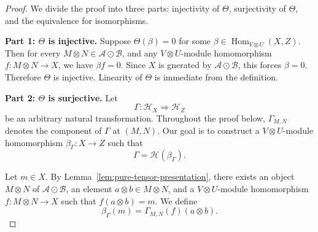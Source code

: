 \documentclass[12pt, english]{article}
\numberwithin{equation}{section}
\DeclareMathOperator{\Hom}{Hom}
\theoremstyle{plain}
\theoremstyle{definition}
\theoremstyle{remark}
\begin{document}
	\begin{proof}
		
		We divide the proof into three parts: injectivity of $\Theta$, surjectivity of $\Theta$, and the equivalence for isomorphisms.
		
		\smallskip
		\noindent\textbf{Part 1: $\Theta$ is injective.}
		Suppose $\Theta(\beta) = 0$ for some $\beta \in \Hom_{V \otimes U} (X, Z)$.
		Then for every $M \otimes N \in \mathcal{A} \odot \mathcal{B}$, and any $V \otimes U$-module homomorphism $f \colon M \otimes N \to X$, we have $\beta f = 0$.
		Since $X$ is gnerated by $\mathcal{A} \odot \mathcal{B}$, this forces $\beta = 0$.
		Therefore $\Theta$ is injective.  Linearity of $\Theta$ is immediate from the definition.
		
		\smallskip
		\noindent\textbf{Part 2: $\Theta$ is surjective.}
		Let
		\[
		\Gamma \colon \mathcal{H}_X \Rightarrow \mathcal{H}_Z
		\]
		be an arbitrary natural transformation.
		Throughout the proof below, $\Gamma_{M, N}$ denotes the component of $\Gamma$ at $(M, N)$.
		Our goal is to construct a $V\otimes U$-module homomorphism $\beta_{\Gamma}\colon X \to Z$ such that
		\[
		\Gamma = \mathcal{H}(\beta_\Gamma).
		\]
		
		Let $m \in X$.  By Lemma~\ref{lem:pure-tensor-presentation}, there exists an object $M \otimes N$ of $\mathcal{A} \odot \mathcal{B}$,
		an element $a \otimes b \in M \otimes N$, and a $V \otimes U$-module homomorphism $f \colon M \otimes N \to X$ such that $f(a \otimes b) = m$.
		We define
		\[
		\beta_\Gamma(m) = \Gamma_{M, N}(f) (a \otimes b).
		\]
		

\end{proof}
\end{document}
